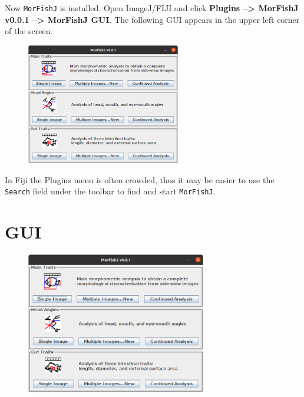 \documentclass[
  letterpaper,
  DIV=11,
  numbers=noendperiod,
  oneside]{scrreprt}
\begin{document}
Now \texttt{MorFishJ} is installed. Open ImageJ/FIJI and click
\textbf{Plugins --\textgreater{} MorFishJ v0.0.1 --\textgreater{}
MorFishJ GUI}. The following GUI appears in the upper left corner of the
screen.

\begin{figure}

{\centering \includegraphics[width=0.6\textwidth,height=\textheight]{./images/screenshots/MorFishJ_GUI_v0.0.1.png}

}

\end{figure}

\begin{tcolorbox}[standard jigsaw,arc=.35mm, toptitle=1mm, titlerule=0mm, bottomtitle=1mm, left=2mm, colbacktitle=quarto-callout-tip-color!10!white, colback=white, opacityback=0, leftrule=.75mm, title=\textcolor{quarto-callout-tip-color}{\faLightbulb}\hspace{0.5em}{Tip}, coltitle=black, rightrule=.15mm, bottomrule=.15mm, toprule=.15mm, opacitybacktitle=0.6, colframe=quarto-callout-tip-color-frame]
In Fiji the Plugins menu is often crowded, thus it may be easier to use
the \texttt{Search} field under the toolbar to find and start
\texttt{MorFishJ}.
\end{tcolorbox}

\hypertarget{gui}{%
\chapter{GUI}\label{gui}}

\begin{figure}

{\centering \includegraphics[width=0.7\textwidth,height=\textheight]{./images/screenshots/MorFishJ_GUI_v0.0.1.png}

}

\end{figure}
\end{document}
